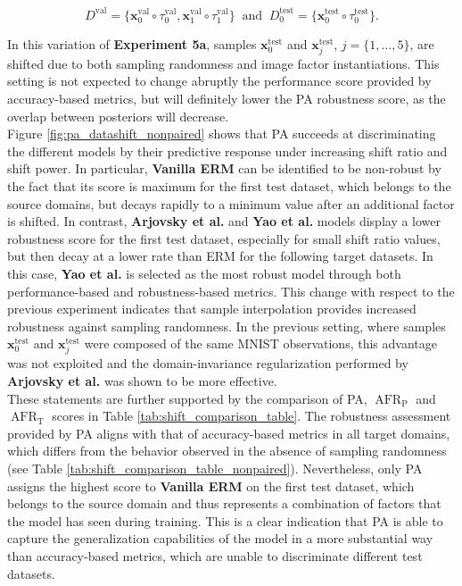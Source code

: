$$
D^{\text{val}} = \{\bm{x}_0^{\text{val}} \circ \tau_0^{\text{val}}, \bm{x}_1^{\text{val}} \circ \tau_1^{\text{val}}\} \;\; \text{and} \;\; D_0^{\text{test}} = \{ \bm{x}_0^{\text{test}} \circ \tau_0^{\text{test}} \}.
$$

In this variation of \textbf{Experiment 5a}, samples $\bm{x}_0^{\text{test}}$ and $\bm{x}_j^{\text{test}}$,
$j=\{1, \dots, 5\}$, are shifted due to both sampling randomness and image factor instantiations. This setting 
is not expected to change abruptly the performance score provided by accuracy-based metrics, but will definitely 
lower the PA robustness score, as the overlap between posteriors will decrease. \\

Figure \ref{fig:pa_datashift_nonpaired} shows that PA succeeds at discriminating the 
different models by their predictive response under increasing shift ratio and 
shift power. In particular, {\color{tab:blue} \textbf{Vanilla ERM}} can be identified 
to be non-robust by the fact that its score is maximum for the first test dataset, which belongs 
to the source domains, but decays rapidly to a minimum value after an additional factor is shifted. 
In contrast, {\color{tab:orange} \textbf{Arjovsky et al.}} and {\color{tab:green} \textbf{Yao et al.}} 
models display a lower robustness score for the first test dataset, especially
for small shift ratio values, but then decay at a lower rate than ERM
for the following target datasets. In this case, {\color{tab:green} \textbf{Yao et al.}} is 
selected as the most robust model through both performance-based and robustness-based metrics. This
change with respect to the previous experiment indicates that sample interpolation provides increased
robustness against sampling randomness. In the previous setting, where samples $\bm{x}_0^{\text{test}}$
and $\bm{x}_j^{\text{test}}$ were composed of the same MNIST observations, this advantage was not exploited and
the domain-invariance regularization performed by {\color{tab:orange} \textbf{Arjovsky et al.}} was shown to
be more effective. \\

These statements are further supported by the comparison of PA, $\operatorname{AFR}_{\text{P}}$ and
$\operatorname{AFR}_{\text{T}}$ scores in Table \ref{tab:shift_comparison_table}. The robustness assessment
provided by PA aligns with that of accuracy-based metrics in all target domains, which differs from the
behavior observed in the absence of sampling randomness (see Table \ref{tab:shift_comparison_table_nonpaired}). Nevertheless, only 
PA assigns the highest score to {\color{tab:blue} \textbf{Vanilla ERM}} on the first test dataset, which belongs to the source domain and thus
represents a combination of factors that the model has seen during training. This is a clear indication
that PA is able to capture the generalization capabilities of the model in a more substantial way than
accuracy-based metrics, which are unable to discriminate different test datasets. \\

